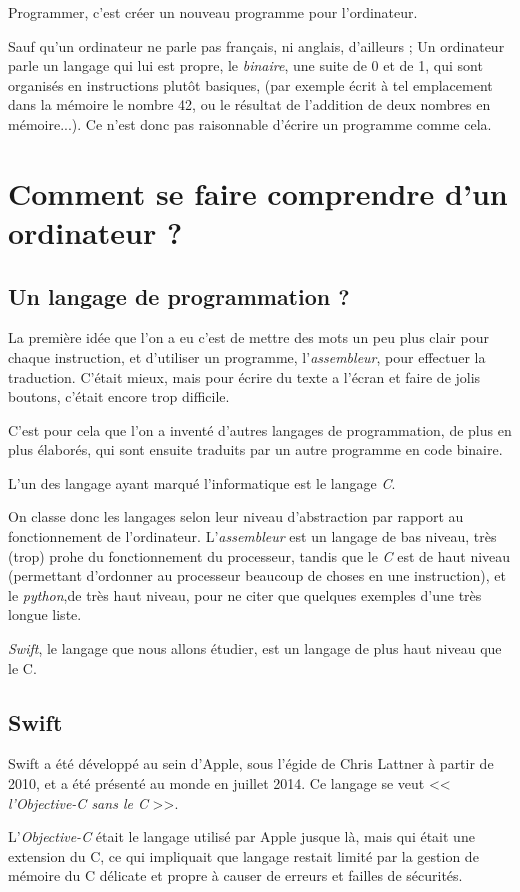 Programmer, c'est créer un nouveau programme pour l'ordinateur.

Sauf qu'un ordinateur ne parle pas français, ni anglais, d'ailleurs ; Un ordinateur parle un
langage qui lui est propre, le \emph{binaire}, une suite de 0 et de 1, qui sont organisés en
instructions plutôt basiques, (par exemple écrit à tel emplacement dans la mémoire le
nombre 42, ou le résultat de l'addition de deux nombres en mémoire...). Ce n'est donc pas
raisonnable d'écrire un programme comme cela.
\section{Comment se faire comprendre d'un ordinateur ?}
\subsection{Un langage de programmation ?}
La première idée que l'on a eu c'est de mettre des mots un peu plus clair pour chaque
instruction, et d'utiliser un programme, l'\emph{assembleur}, pour effectuer la traduction. C'était
mieux, mais pour écrire du texte a l'écran et faire de jolis boutons, c'était encore trop
difficile.

C'est pour cela que l'on a inventé d'autres langages de programmation, de plus en plus
élaborés, qui sont ensuite traduits par un autre programme en code binaire.

L'un des langage ayant marqué l'informatique est le langage \emph{C}.

On classe donc les langages selon leur niveau d'abstraction par rapport au
fonctionnement de l'ordinateur. L'\emph{assembleur} est un langage de bas niveau, très (trop)
prohe du fonctionnement du processeur, tandis que le \emph{C} est de haut niveau (permettant
d'ordonner au processeur beaucoup de choses en une instruction), et le \emph{python},de très
haut niveau, pour ne citer que quelques exemples d'une très longue liste.%

\emph{Swift}, le langage que nous allons étudier, est un langage de plus haut niveau
que le C.
\subsection{Swift}
Swift a été développé au sein d'Apple, sous l'égide de Chris Lattner à partir de 2010, et a
été présenté au monde en juillet 2014. Ce langage se veut << \emph{l'Objective-C sans le C} >>.

L'\emph{Objective-C} était le langage utilisé par Apple jusque là, mais qui était une extension du
C, ce qui impliquait que langage restait limité par la gestion de mémoire du C délicate et propre à causer de erreurs et failles de sécurités.

